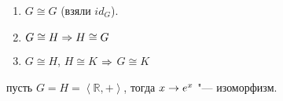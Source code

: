 \begin{conseq}
    \begin{enumerate}
    \item  $G \cong G$ (взяли $id_G$).
    \item  $G \cong H \Rightarrow H \cong G$
    \item  $G \cong H$, $H \cong K$ $\Rightarrow$ $G \cong K$
    \end{enumerate}

\end{conseq}

\begin{exmp}
пусть $G=H=\left< \mathbb{R}, +\right>$, тогда $x \rightarrow e^x$ "--- изоморфизм.
\end{exmp}
